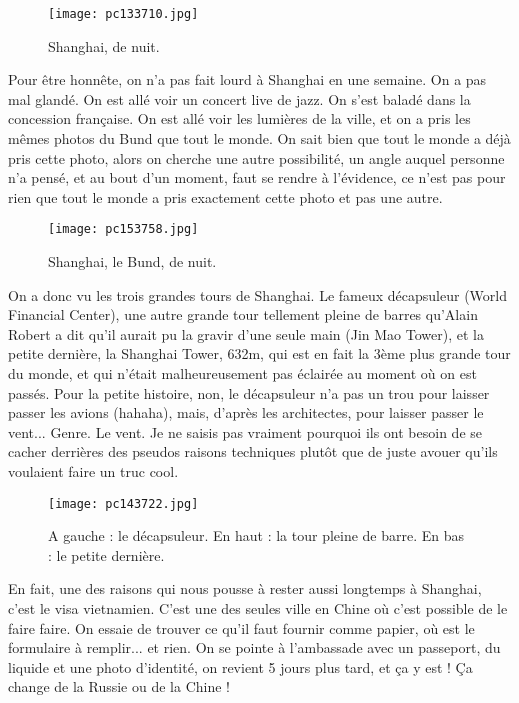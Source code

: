 \documentclass{book}
\begin{document}
\begin{figure}[h]
\centering
\texttt{[image: pc133710.jpg]}
\caption*{Shanghai, de nuit.}
\end{figure}

Pour être honnête, on n'a pas fait lourd à Shanghai en une semaine. On a pas mal glandé. On est allé voir un concert live de jazz. On s'est baladé dans la concession française. On est allé voir les lumières de la ville, et on a pris les mêmes photos du Bund que tout le monde. On sait bien que tout le monde a déjà pris cette photo, alors on cherche une autre possibilité, un angle auquel personne n'a pensé, et au bout d'un moment, faut se rendre à l'évidence, ce n'est pas pour rien que tout le monde a pris exactement cette photo et pas une autre.


\begin{figure}[h]
\centering
\texttt{[image: pc153758.jpg]}
\caption*{Shanghai, le Bund, de nuit.}
\end{figure}

On a donc vu les trois grandes tours de Shanghai. Le fameux décapsuleur (World Financial Center), une autre grande tour tellement pleine de barres qu'Alain Robert a dit qu'il aurait pu la gravir d'une seule main (Jin Mao Tower), et la petite dernière, la Shanghai Tower, 632m, qui est en fait la 3ème plus grande tour du monde, et qui n'était malheureusement pas éclairée au moment où on est passés. Pour la petite histoire, non, le décapsuleur n'a pas un trou pour laisser passer les avions (hahaha), mais, d'après les architectes, pour laisser passer le vent... Genre. Le vent. Je ne saisis pas vraiment pourquoi ils ont besoin de se cacher derrières des pseudos raisons techniques plutôt que de juste avouer qu'ils voulaient faire un truc cool.


\begin{figure}[h]
\centering
\texttt{[image: pc143722.jpg]}
\caption*{A gauche : le décapsuleur. En haut : la tour pleine de barre. En bas : le petite dernière.}
\end{figure}

En fait, une des raisons qui nous pousse à rester aussi longtemps à Shanghai, c'est le visa vietnamien. C'est une des seules ville en Chine où c'est possible de le faire faire. On essaie de trouver ce qu'il faut fournir comme papier, où est le formulaire à remplir... et rien. On se pointe à l'ambassade avec un passeport, du liquide et une photo d'identité, on revient 5 jours plus tard, et ça y est ! Ça change de la Russie ou de la Chine !
\end{document}
